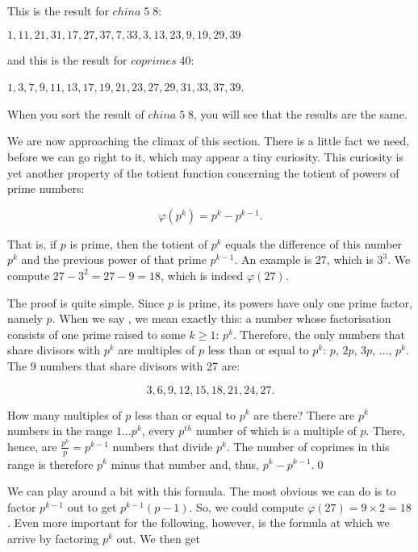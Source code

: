 \documentclass[tikz]{scrreprt}
\newcommand{\Varid}[1]{\mathit{#1}}
\begin{document}
This is the result for \ensuremath{\Varid{china}\;\mathrm{5}\;\mathrm{8}}:

\ensuremath{\mathrm{1},\mathrm{11},\mathrm{21},\mathrm{31},\mathrm{17},\mathrm{27},\mathrm{37},\mathrm{7},\mathrm{33},\mathrm{3},\mathrm{13},\mathrm{23},\mathrm{9},\mathrm{19},\mathrm{29},\mathrm{39}}

and this is the result for \ensuremath{\Varid{coprimes}\;\mathrm{40}}:

\ensuremath{\mathrm{1},\mathrm{3},\mathrm{7},\mathrm{9},\mathrm{11},\mathrm{13},\mathrm{17},\mathrm{19},\mathrm{21},\mathrm{23},\mathrm{27},\mathrm{29},\mathrm{31},\mathrm{33},\mathrm{37},\mathrm{39}}.

When you sort the result of \ensuremath{\Varid{china}\;\mathrm{5}\;\mathrm{8}}, you will
see that the results are the same.

We are now approaching the climax of this section.
There is a little fact we need, before we can
go right to it, which may appear a tiny curiosity.
This curiosity is yet another property of
the totient function concerning the totient
of powers of prime numbers:

\begin{equation}
\varphi(p^k) = p^k - p^{k-1}.
\end{equation}

That is, if $p$ is prime, then
the totient of $p^k$ equals
the difference of this number $p^k$
and the previous power of that prime $p^{k-1}$.
An example is 27, which is $3^3$.
We compute $27 - 3^2 = 27 - 9 = 18$,
which is indeed $\varphi(27)$.

The proof is quite simple.
Since $p$ is prime, its powers 
have only one prime factor,
namely $p$. When we say ,
we mean exactly this: a number whose factorisation
consists of one prime raised to some $k\ge 1$: $p^k$.
Therefore, the only numbers that share divisors
with $p^k$ are multiples of $p$ less than
or equal to $p^k$: $p$, $2p$, $3p$, $\dots$, $p^k$.
The 9 numbers that share divisors with 27 are:

\[
3,6,9,12,15,18,21,24,27.
\]

How many multiples of $p$ less than or equal to $p^k$ are there?
There are $p^k$ numbers in the range $1\dots p^k$,
every $p^{th}$ number of which is a multiple of $p$.
There, hence, are $\frac{p^k}{p} = p^{k-1}$ numbers that divide $p^k$.
The number of coprimes in this range 
is therefore $p^k$ minus that number and, thus,
$p^k - p^{k-1}$.\qed

We can play around a bit with this formula.
The most obvious we can do is to factor $p^{k-1}$ out
to get $p^{k-1}(p-1)$.
So, we could compute $\varphi(27) = 9\times2 = 18$.
Even more important for the following, however,
is the formula at which we arrive by factoring
$p^k$ out. We then get
\end{document}
